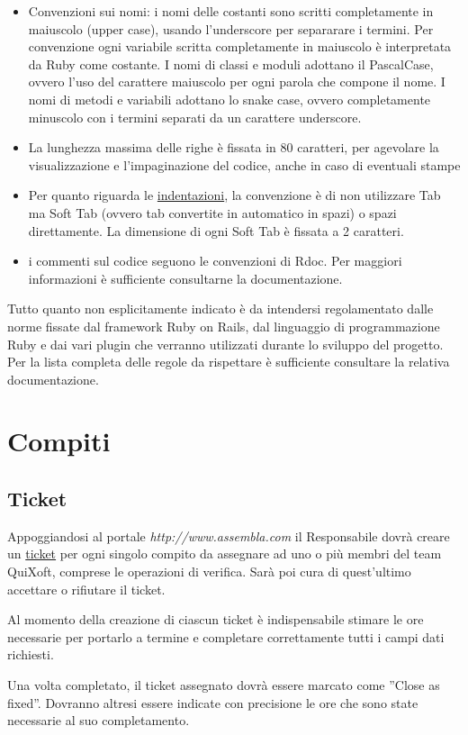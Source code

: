 \documentclass[11pt,a4paper]{article}
\begin{document}
\begin{itemize}
  \item Convenzioni sui nomi: i nomi delle costanti sono scritti completamente in maiuscolo (upper case), usando l’underscore per separarare i termini. Per convenzione ogni variabile scritta completamente in maiuscolo è interpretata da Ruby come costante. I nomi di classi e moduli adottano il PascalCase, ovvero l’uso del carattere maiuscolo per ogni parola che compone il nome. I nomi di metodi e variabili adottano lo snake case, ovvero completamente minuscolo con i termini separati da un carattere underscore.
  \item La lunghezza massima delle righe è fissata in 80 caratteri, per agevolare la visualizzazione e l'impaginazione del codice, anche in caso di eventuali stampe
  \item Per quanto riguarda le \underline{indentazioni}, la convenzione è di non utilizzare Tab ma Soft Tab (ovvero tab convertite in automatico in spazi) o spazi direttamente. La dimensione di ogni Soft Tab è fissata a 2 caratteri.
  \item i commenti sul codice seguono le convenzioni di Rdoc. Per maggiori informazioni è sufficiente consultarne la documentazione.
\end{itemize}
Tutto quanto non esplicitamente indicato è da intendersi regolamentato dalle norme fissate dal framework Ruby on Rails, dal linguaggio di programmazione Ruby e dai vari plugin che verranno utilizzati durante lo sviluppo del progetto.
Per la lista completa delle regole da rispettare è sufficiente consultare la relativa documentazione.

\section{Compiti}
\subsection{Ticket}
Appoggiandosi al portale \textit{http://www.assembla.com} il Responsabile dovrà creare un \underline{ticket} per ogni singolo compito da assegnare ad uno o più membri del team QuiXoft, comprese le operazioni di verifica.
Sarà poi cura di quest'ultimo accettare o rifiutare il ticket.

Al momento della creazione di ciascun ticket è indispensabile stimare le ore necessarie per portarlo a termine e completare correttamente tutti i campi dati richiesti.

Una volta completato, il ticket assegnato dovrà essere marcato come ''Close as fixed''. Dovranno altresi essere indicate con precisione le ore che sono state necessarie al suo completamento.
\end{document}

